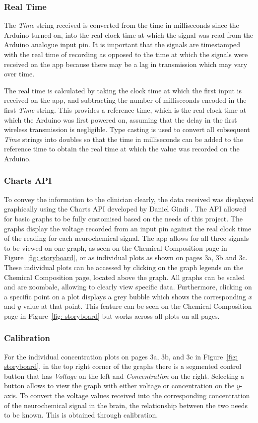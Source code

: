 \subsubsection{Real Time} \label{section: real time}
The \textit{Time} string received is converted from the time in milliseconds since the Arduino turned on, into the real clock time at which the signal was read from the Arduino analogue input pin. It is important that the signals are timestamped with the real time of recording as opposed to the time at which the signals were received on the app because there may be a lag in transmission which may vary over time.

The real time is calculated by taking the clock time at which the first input is received on the app, and subtracting the number of milliseconds encoded in the first \textit{Time} string. This provides a reference time, which is the real clock time at which the Arduino was first powered on, assuming that the delay in the first wireless transmission is negligible. Type casting is used to convert all subsequent \textit{Time} strings into doubles so that the time in milliseconds can be added to the reference time to obtain the real time at which the value was recorded on the Arduino.


\subsubsection{Charts API}
To convey the information to the clinician clearly, the data received was displayed graphically using the Charts API developed by Daniel Gindi \cite{Charts}. The API allowed for basic graphs to be fully customised based on the needs of this project. The graphs display the voltage recorded from an input pin against the real clock time of the reading for each neurochemical signal. The app allows for all three signals to be viewed on one graph, as seen on the Chemical Composition page in Figure~\ref{fig: storyboard}, or as individual plots as shown on pages 3a, 3b and 3c. These individual plots can be accessed by clicking on the graph legends on the Chemical Composition page, located above the graph. All graphs can be scaled and are zoombale, allowing to clearly view specific data. Furthermore, clicking on a specific point on a plot displays a grey bubble which shows the corresponding $x$ and $y$ value at that point. This feature can be seen on the Chemical Composition page in Figure~\ref{fig: storyboard} but works across all plots on all pages.


\subsubsection{Calibration}
For the individual concentration plots on pages 3a, 3b, and 3c in Figure~\ref{fig: storyboard}, in the top right corner of the graphs there is a segmented control button that has \textit{Voltage} on the left and \textit{Concentration} on the right. Selecting a button allows to view the graph with either voltage or concentration on the $y$-axis. To convert the voltage values received into the corresponding concentration of the neurochemical signal in the brain, the relationship between the two needs to be known. This is obtained through calibration. 

